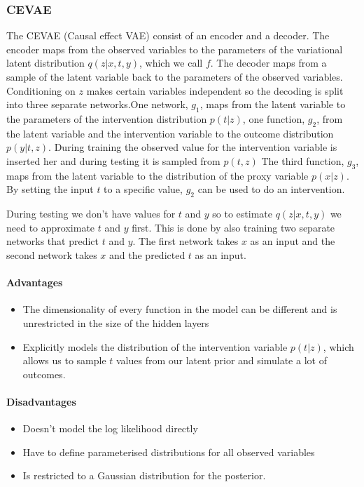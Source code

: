 \documentclass{article}
\begin{document}
\subsubsection{CEVAE}
The CEVAE (Causal effect VAE) consist of an encoder and a decoder. The encoder maps from the observed variables to the parameters of the variational latent distribution $q(z|x,t,y)$, which we call $f$. The decoder maps from a sample of the latent variable back to the parameters of the observed variables. Conditioning on $z$ makes certain variables independent so the decoding is split into three separate networks.One network, $g_1$, maps from the latent variable to the parameters of the intervention distribution $p(t|z)$, one function, $g_2$, from the latent variable and the intervention variable to the outcome distribution $p(y|t,z)$. During training the observed value for the intervention variable is inserted her and during testing it is sampled from $p(t,z)$ The third function, $g_3$, maps from the latent variable to the distribution of the proxy variable $p(x|z)$. By setting the input $t$ to a specific value, $g_2$ can be used to do an intervention.

During testing we don't have values for $t$ and $y$ so to estimate $q(z|x,t,y)$ we need to approximate $t$ and $y$ first. This is done by also training two separate networks that predict $t$ and $y$. The first network takes $x$ as an input and the second network takes $x$ and the predicted $t$ as an input.

\paragraph{Advantages}
\begin{itemize}
    \item The dimensionality of every function in the model can be different and is unrestricted in the size of the hidden layers
    \item  Explicitly models the distribution of the intervention variable $p(t|z)$, which allows us to sample $t$ values from our latent prior and simulate a lot of outcomes.
\end{itemize}
\paragraph{Disadvantages}
\begin{itemize}
    \item Doesn't model the log likelihood directly
    \item Have to define parameterised distributions for all observed variables
    \item Is restricted to a Gaussian distribution for the posterior.
\end{itemize}
\end{document}
